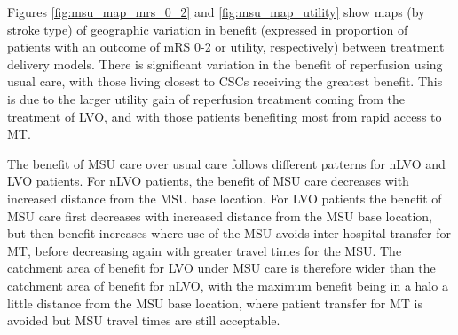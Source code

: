 Figures \ref{fig:msu_map_mrs_0_2} and \ref{fig:msu_map_utility} show maps (by stroke type) of geographic variation in benefit (expressed in proportion of patients with an outcome of mRS 0-2 or utility, respectively) between treatment delivery models. There is significant variation in the benefit of reperfusion using usual care, with those living closest to CSCs receiving the greatest benefit. This is due to the larger utility gain of reperfusion treatment coming from the treatment of LVO, and with those patients benefiting most from rapid access to MT.

The benefit of MSU care over usual care follows different patterns for nLVO and LVO patients. For nLVO patients, the benefit of MSU care decreases with increased distance from the MSU base location. For LVO patients the benefit of MSU care first decreases with increased distance from the MSU base location, but then benefit increases where use of the MSU avoids inter-hospital transfer for MT, before decreasing again with greater travel times for the MSU. The catchment area of benefit for LVO under MSU care is therefore wider than the catchment area of benefit for nLVO, with the maximum benefit being in a halo a little distance from the MSU base location, where patient transfer for MT is avoided but MSU travel times are still acceptable.

